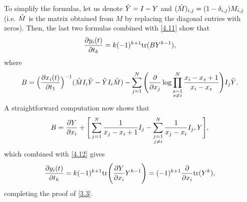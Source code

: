 \documentclass[11pt,reqno]{amsart}
\theoremstyle{definition}
\numberwithin{equation}{section}
\begin{document}
To simplify the formulas, let us denote ${\hat{Y}}=I-Y$ and 
$({\hat{M}})_{i,j}=(1-\delta_{i,j})M_{i,j}$ (i.e. ${\hat{M}}$ is the matrix obtained from 
$M$ by replacing the diagonal entries with zeros). Then, the last 
two formulas combined with \eqref{4.11} show that 
\begin{equation}\label{4.12}
\frac{\partial y_i(t)}{\partial t_k}=k(-1)^{k+1} \mathrm{tr}(BY^{k-1}),
\end{equation}
where 
\begin{equation*}
B=\Big(\frac{\partial x_i(t)}{\partial t_1}\Big)^{-1}({\hat{M}} I_i{\hat{Y}}-{\hat{Y}} I_i{\hat{M}})
-\sum_{j=1}^N\Bigg(\frac{\partial}{\partial x_j}\log
\prod_{\begin{subarray}{c}s=1 \\s\neq i\end{subarray}}^N
\frac{x_i-x_s+1}{x_i-x_s}\Bigg)I_j{\hat{Y}}.
\end{equation*}
A straightforward computation now shows that
\begin{equation*}
B=\frac{\partial Y}{\partial x_i}+\Bigg[
\sum_{j=1}^N\frac{1}{x_j-x_i+1}I_j
-\sum_{\begin{subarray}{c}j=1 \\j\neq i\end{subarray}}^N\frac{1}{x_j-x_i}I_j
,Y\Bigg],
\end{equation*}
which combined with \eqref{4.12} gives
\begin{equation*}
\frac{\partial y_i(t)}{\partial t_k}
=k(-1)^{k+1} \mathrm{tr}\Bigg(\frac{\partial Y}{\partial x_i}Y^{k-1}\Bigg)=
(-1)^{k+1}\frac{\partial }{\partial x_i}\mathrm{tr}(Y^{k}),
\end{equation*}
completing the proof of \eqref{3.3}.
\end{document}
